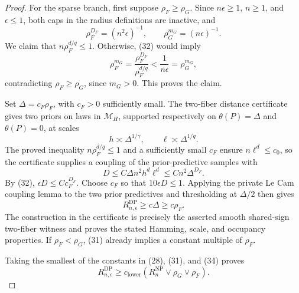 \documentclass{article}
\begin{document}
\begin{proof}
For the sparse branch, first suppose \(\rho_F\ge\rho_G\).  Since \(n\epsilon\ge1\), \(n\ge1\), and \(\epsilon\le1\), both caps in the radius definitions are inactive, and
\[
 \rho_F^{D_F}=(n^2\epsilon)^{-1},
 \qquad \rho_G^{m_G}=(n\epsilon)^{-1}.
 \tag{32}
\]
We claim that \(n\rho_F^{d/q}\le1\).  Otherwise, (32) would imply
\[
 \rho_F^{m_G}
 =\frac{\rho_F^{D_F}}{\rho_F^{d/q}}
 <\frac1{n\epsilon}
 =\rho_G^{m_G},
\]
contradicting \(\rho_F\ge\rho_G\), since \(m_G>0\).  This proves the claim.

Set \(\Delta=c_F\rho_F\), with \(c_F>0\) sufficiently small.  The two-fiber distance certificate gives two priors on laws in \(\mathcal M_H\), supported respectively on \(\theta(P)=\Delta\) and \(\theta(P)=0\), at scales
\[
 h\asymp\Delta^{1/\gamma},\qquad
 \ell\asymp\Delta^{1/q}.
\]
The proved inequality \(n\rho_F^{d/q}\le1\) and a sufficiently small \(c_F\) ensure \(n\ell^d\le c_0\), so the certificate supplies a coupling of the prior-predictive samples with
\[
 D\le C\Delta n^2h^d\ell^d
 \le Cn^2\Delta^{D_F}.
 \tag{33}
\]
By (32), \(\epsilon D\le Cc_F^{D_F}\).  Choose \(c_F\) so that \(10\epsilon D\le1\).  Applying the private Le Cam coupling lemma to the two prior predictives and thresholding at \(\Delta/2\) then gives
\[
 R_{n,\epsilon}^{\mathrm{DP}}\ge c\Delta\ge c\rho_F.
 \tag{34}
\]
The construction in the certificate is precisely the asserted smooth shared-sign two-fiber witness and proves the stated Hamming, scale, and occupancy properties.  If \(\rho_F<\rho_G\), (31) already implies a constant multiple of \(\rho_F\).

Taking the smallest of the constants in (28), (31), and (34) proves
\[
 R_{n,\epsilon}^{\mathrm{DP}}
 \ge c_{\mathrm{lower}}\left(R_n^{\mathrm{NP}}\vee\rho_G\vee\rho_F\right).
\]
\end{proof}
\end{document}
